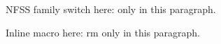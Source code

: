 NFSS family switch here: \rmfamily only in this paragraph.

Inline macro here: \textrm{rm} only in this paragraph.

